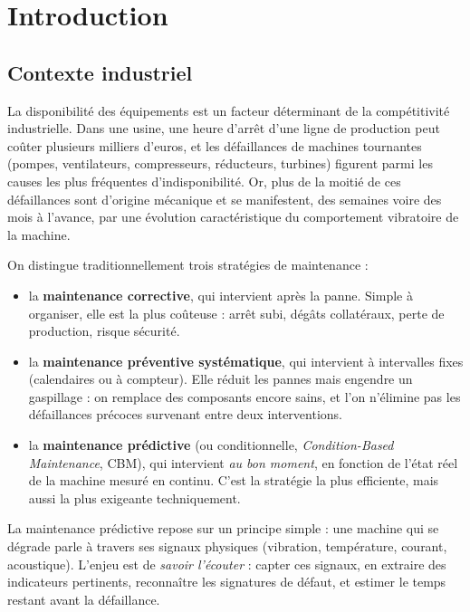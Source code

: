 \chapter{Introduction}

\section{Contexte industriel}
La disponibilité des équipements est un facteur déterminant de la compétitivité
industrielle. Dans une usine, une heure d'arrêt d'une ligne de production peut coûter
plusieurs milliers d'euros, et les défaillances de machines tournantes (pompes,
ventilateurs, compresseurs, réducteurs, turbines) figurent parmi les causes les plus
fréquentes d'indisponibilité. Or, plus de la moitié de ces défaillances sont d'origine
mécanique et se manifestent, des semaines voire des mois à l'avance, par une évolution
caractéristique du comportement vibratoire de la machine.

On distingue traditionnellement trois stratégies de maintenance :
\begin{itemize}[leftmargin=1.5em]
  \item la \textbf{maintenance corrective}, qui intervient après la panne. Simple à
        organiser, elle est la plus coûteuse : arrêt subi, dégâts collatéraux, perte de
        production, risque sécurité.
  \item la \textbf{maintenance préventive systématique}, qui intervient à intervalles
        fixes (calendaires ou à compteur). Elle réduit les pannes mais engendre un
        gaspillage : on remplace des composants encore sains, et l'on n'élimine pas les
        défaillances précoces survenant entre deux interventions.
  \item la \textbf{maintenance prédictive} (ou conditionnelle, \emph{Condition-Based
        Maintenance}, CBM), qui intervient \emph{au bon moment}, en fonction de l'état
        réel de la machine mesuré en continu. C'est la stratégie la plus efficiente, mais
        aussi la plus exigeante techniquement.
\end{itemize}

La maintenance prédictive repose sur un principe simple : une machine qui se dégrade
\og parle \fg{} à travers ses signaux physiques (vibration, température, courant,
acoustique). L'enjeu est de \emph{savoir l'écouter} : capter ces signaux, en extraire des
indicateurs pertinents, reconnaître les signatures de défaut, et estimer le temps restant
avant la défaillance.

